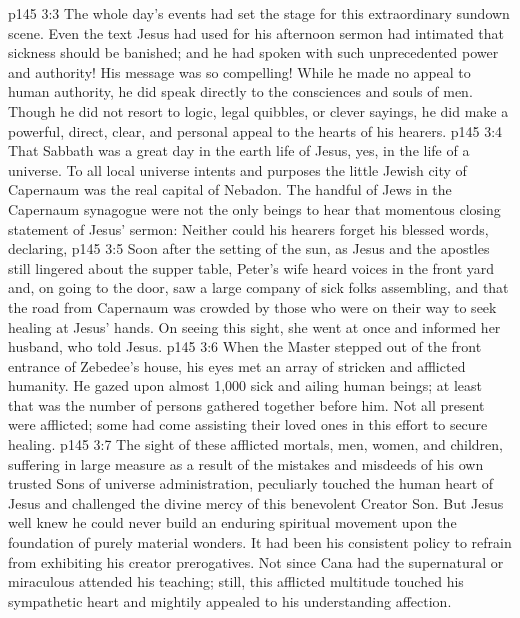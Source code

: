 \vs p145 3:3 The whole day’s events had set the stage for this extraordinary sundown scene. Even the text Jesus had used for his afternoon sermon had intimated that sickness should be banished; and he had spoken with such unprecedented power and authority! His message was so compelling! While he made no appeal to human authority, he did speak directly to the consciences and souls of men. Though he did not resort to logic, legal quibbles, or clever sayings, he did make a powerful, direct, clear, and personal appeal to the hearts of his hearers.
\vs p145 3:4 \pc That Sabbath was a great day in the earth life of Jesus, yes, in the life of a universe. To all local universe intents and purposes the little Jewish city of Capernaum was the real capital of Nebadon. The handful of Jews in the Capernaum synagogue were not the only beings to hear that momentous closing statement of Jesus’ sermon:  Neither could his hearers forget his blessed words, declaring, 
\vs p145 3:5 \pc Soon after the setting of the sun, as Jesus and the apostles still lingered about the supper table, Peter’s wife heard voices in the front yard and, on going to the door, saw a large company of sick folks assembling, and that the road from Capernaum was crowded by those who were on their way to seek healing at Jesus’ hands. On seeing this sight, she went at once and informed her husband, who told Jesus.
\vs p145 3:6 When the Master stepped out of the front entrance of Zebedee’s house, his eyes met an array of stricken and afflicted humanity. He gazed upon almost 1,000 sick and ailing human beings; at least that was the number of persons gathered together before him. Not all present were afflicted; some had come assisting their loved ones in this effort to secure healing.
\vs p145 3:7 The sight of these afflicted mortals, men, women, and children, suffering in large measure as a result of the mistakes and misdeeds of his own trusted Sons of universe administration, peculiarly touched the human heart of Jesus and challenged the divine mercy of this benevolent Creator Son. But Jesus well knew he could never build an enduring spiritual movement upon the foundation of purely material wonders. It had been his consistent policy to refrain from exhibiting his creator prerogatives. Not since Cana had the supernatural or miraculous attended his teaching; still, this afflicted multitude touched his sympathetic heart and mightily appealed to his understanding affection.
